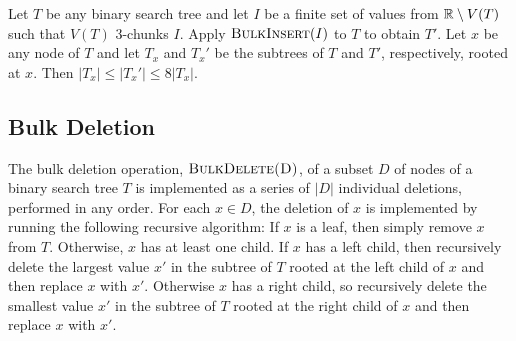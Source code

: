 \documentclass[10pt, conference, compsocconf]{IEEEtran}
\let\le\leqslant
\begin{document}

\begin{lem}
  Let $T$ be any binary search tree and let $I$ be a finite set of values from $\mathbb{R}\setminus V(T)$ such that
  $V(T)$ $3$-chunks $I$.
  Apply $\textsc{BulkInsert}(I)$ to $T$ to obtain $T'$.
  Let $x$ be any node of $T$ and let $T_x$ and $T_x'$ be the subtrees of $T$ and $T'$, respectively, rooted at $x$.
  Then $|T_x|\le |T_x'|\le 8|T_x|$.
\end{lem}



\subsection{Bulk Deletion}

The bulk deletion operation, $\textsc{BulkDelete(D)}$, of a subset $D$ of nodes of a binary search tree $T$ is implemented as a series of $|D|$ individual deletions, performed in any order. For each $x\in D$, the deletion of $x$ is implemented by running the following recursive algorithm:  If $x$ is a leaf, then simply remove $x$ from $T$.  Otherwise, $x$ has at least one child.  If $x$ has a left child, then recursively delete the largest value $x'$ in the subtree of $T$ rooted at the left child of $x$ and then replace $x$ with $x'$.  Otherwise $x$ has a right child, so recursively delete the smallest value $x'$ in the subtree of $T$ rooted at the right child of $x$ and then replace $x$ with $x'$.
\end{document}
